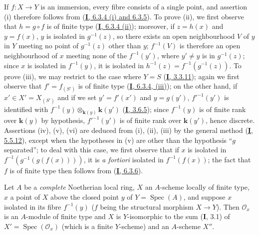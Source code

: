 If $f:X\to Y$ is an immersion, every fibre consists of a single point, and
assertion (i) therefore follows from (\hyperref[I.6.3.4]{\textbf{I}, 6.3.4 (i) and
6.3.5}). To prove (ii), we first observe that $h=g\circ f$ is of finite type
(\hyperref[I.6.3.4]{\textbf{I}, 6.3.4 (ii)}); moreover, if $z=h(x)$ and
$y=f(x)$, $y$ is isolated in $g^{-1}(z)$, so there exists an open
neighbourhood $V$ of $y$ in $Y$ meeting no point of $g^{-1}(z)$ other than
$y$; $f^{-1}(V)$ is therefore an open neighbourhood of $x$ meeting none
of the $f^{-1}(y')$, where $y'\neq y$ is in $g^{-1}(z)$; since $x$ is
isolated in $f^{-1}(y)$, it is isolated in
$h^{-1}(z)=f^{-1}(g^{-1}(z))$. To prove (iii), we may restrict to the case
where $Y=S$ (\hyperref[I.3.3.11]{\textbf{I}, 3.3.11}); again we first observe that
$f'=f_{(S')}$ is of finite type
(\hyperref[I.6.3.4]{\textbf{I}, 6.3.4, (iii)}); on the other hand, if
$x'\in X'=X_{(S')}$ and if we set $y'=f'(x')$ and $y=g(y')$,
$f'^{-1}(y')$ is identified with
$f^{-1}(y)\otimes_{\boldsymbol{k}(y)}\boldsymbol{k}(y')$ (\hyperref[I.3.6.5]{\textbf{I}, 3.6.5}); since
$f^{-1}(y)$ is of finite rank over $\boldsymbol{k}(y)$ by hypothesis, $f'^{-1}(y')$ is of
finite rank over $\boldsymbol{k}(y')$, hence discrete. Assertions (iv), (v), (vi) are
deduced from (i), (ii), (iii) by the general method
(\hyperref[I.5.5.12]{\textbf{I}, 5.5.12}), except when the hypotheses in (v) are
other than the hypothesis ``$g$ separated''; to deal with this case, we
first observe that if $x$ is isolated in
$f^{-1}(g^{-1}(g(f(x))))$, it is \emph{a fortiori} isolated in
$f^{-1}(f(x))$; the fact that $f$ is of finite type then follows from
(\hyperref[I.6.3.6]{\textbf{I}, 6.3.6}).

\begin{proposition}[6.2.5]
\label{II.6.2.5}
Let $A$ be a \emph{complete} Noetherian local ring, $X$ an $A$-scheme locally of
finite type, $x$ a point of $X$ above the closed point $y$ of
$Y=\operatorname{Spec}(A)$, and suppose $x$ isolated in its fibre
$f^{-1}(y)$ ($f$ being the structural morphism $X\to Y$). Then
$\mathcal{O}_x$ is an $A$-module of finite type and $X$ is $Y$-isomorphic to
the sum \textup{(\textbf{I}, 3.1)} of
$X'=\operatorname{Spec}(\mathcal{O}_x)$ (which is a finite $Y$-scheme) and an
$A$-scheme $X''$.
\end{proposition}

